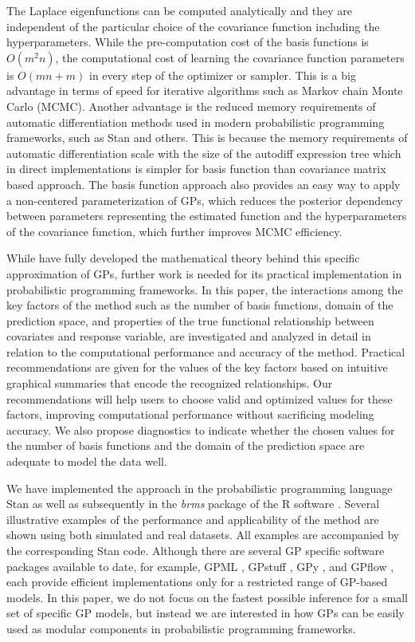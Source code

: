 The Laplace eigenfunctions can be computed analytically and they are independent of the particular choice of the covariance function including the hyperparameters. While the pre-computation cost of the basis functions is $O(m^2n)$, the computational cost of learning the covariance function parameters is $O(mn+m)$ in every step of the optimizer or sampler. This is a big advantage in terms of speed for iterative algorithms such as Markov chain Monte Carlo (MCMC). Another advantage is the reduced memory requirements of automatic differentiation methods used in modern probabilistic programming frameworks, such as Stan \citep{carpenter2017stan} and others. This is because the memory requirements of automatic differentiation scale with the size of the autodiff expression tree which in direct implementations is simpler for basis function than covariance matrix based approach. The basis function approach also provides an easy way to apply a non-centered parameterization of GPs, which reduces the posterior dependency between parameters representing the estimated function and the hyperparameters of the covariance function, which further improves MCMC efficiency.

While \citet{solin2018hilbert} have fully developed the mathematical theory behind this specific approximation of GPs, further work is needed for its practical implementation in probabilistic programming frameworks. In this paper, the interactions among the key factors of the method such as the number of basis functions, domain of the prediction space, and properties of the true functional relationship between covariates and response variable, are investigated and analyzed in detail in relation to the computational performance and accuracy of the method. Practical recommendations are given for the values of the key factors based on intuitive graphical summaries that encode the recognized relationships. Our recommendations will help users to choose valid and optimized values for these factors, improving computational performance without sacrificing modeling accuracy. We also propose  diagnostics to indicate whether the chosen values for the number of basis functions and the domain of the prediction space are adequate to model the data well.

We have implemented the approach in the probabilistic programming language Stan \citep{carpenter2017stan} as well as subsequently in the \textit{brms} package \citep{burkner2017brms} of the R software \citep{R2019R}. Several illustrative examples of the performance and applicability of the method are shown using both simulated and real datasets. All examples are accompanied by the corresponding Stan code. Although there are several GP specific software packages available to date, for example, GPML \citep{rasmussen2010gpml},  GPstuff \citep{vanhatalo2013gpstuff}, GPy \citep{gpy2014}, and GPflow \citep{GPflow2017}, each provide efficient implementations only for a restricted range of GP-based models. In this paper, we do not focus on the fastest possible inference for a small set of specific GP models, but instead we are interested in how GPs can be easily used as modular components in probabilistic programming frameworks. 

